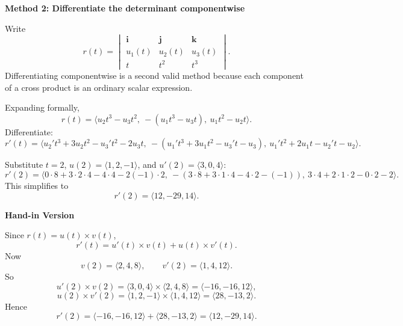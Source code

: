 \documentclass[a4paper,12pt,twocolumn]{article}
\newenvironment{solutionbox}{\begin{framed}}{\end{framed}}
\begin{document}
\begin{solutionbox}
\textbf{Method 2: Differentiate the determinant componentwise}

\begin{steps}
\item Write
\[
r(t)=
\begin{vmatrix}
\mathbf i & \mathbf j & \mathbf k\\
u_1(t) & u_2(t) & u_3(t)\\
t & t^2 & t^3
\end{vmatrix}.
\]
Differentiating componentwise is a second valid method because each component of a cross product is an ordinary scalar expression.

\item Expanding formally,
\[
r(t)=\langle u_2t^3-u_3t^2,\ -(u_1t^3-u_3t),\ u_1t^2-u_2t\rangle.
\]
Differentiate:
\[
r'(t)=\langle u_2't^3+3u_2t^2-u_3't^2-2u_3t,\ -(u_1't^3+3u_1t^2-u_3't-u_3),\ u_1't^2+2u_1t-u_2't-u_2\rangle.
\]

\item Substitute \(t=2\), \(u(2)=\langle 1,2,-1\rangle\), and \(u'(2)=\langle 3,0,4\rangle\):
\[
r'(2)=\langle 0\cdot 8+3\cdot 2\cdot 4-4\cdot 4-2(-1)\cdot 2,\ -(3\cdot 8+3\cdot 1\cdot 4-4\cdot 2-(-1)),\ 3\cdot 4+2\cdot 1\cdot 2-0\cdot 2-2\rangle.
\]
This simplifies to
\[
r'(2)=\langle 12,-29,14\rangle.
\]
\end{steps}
\end{solutionbox}

\begin{solutionbox}
\textbf{Hand-in Version}

Since \(r(t)=u(t)\times v(t)\),
\[
r'(t)=u'(t)\times v(t)+u(t)\times v'(t).
\]
Now
\[
v(2)=\langle 2,4,8\rangle,\qquad v'(2)=\langle 1,4,12\rangle.
\]
So
\[
u'(2)\times v(2)
=\langle 3,0,4\rangle\times \langle 2,4,8\rangle
=\langle -16,-16,12\rangle,
\]
\[
u(2)\times v'(2)
=\langle 1,2,-1\rangle\times \langle 1,4,12\rangle
=\langle 28,-13,2\rangle.
\]
Hence
\[
r'(2)=\langle -16,-16,12\rangle+\langle 28,-13,2\rangle
=\boxed{\langle 12,-29,14\rangle.}
\]
\end{solutionbox}
\end{document}
